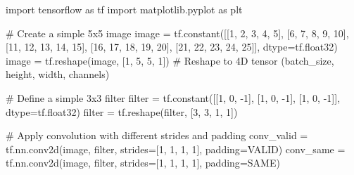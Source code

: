 \documentclass[
  letterpaper,
  DIV=11,
  numbers=noendperiod]{scrreprt}
\newenvironment{Shaded}{\begin{snugshade}}{\end{snugshade}}
\newcommand{\BuiltInTok}[1]{\textcolor[rgb]{0.00,0.23,0.31}{#1}}
\newcommand{\CommentTok}[1]{\textcolor[rgb]{0.37,0.37,0.37}{#1}}
\newcommand{\DecValTok}[1]{\textcolor[rgb]{0.68,0.00,0.00}{#1}}
\newcommand{\ImportTok}[1]{\textcolor[rgb]{0.00,0.46,0.62}{#1}}
\newcommand{\NormalTok}[1]{\textcolor[rgb]{0.00,0.23,0.31}{#1}}
\newcommand{\OperatorTok}[1]{\textcolor[rgb]{0.37,0.37,0.37}{#1}}
\newcommand{\StringTok}[1]{\textcolor[rgb]{0.13,0.47,0.30}{#1}}
\begin{document}
\begin{Shaded}
\begin{Highlighting}[]
\ImportTok{import}\NormalTok{ tensorflow }\ImportTok{as}\NormalTok{ tf}
\ImportTok{import}\NormalTok{ matplotlib.pyplot }\ImportTok{as}\NormalTok{ plt}

\CommentTok{\# Create a simple 5x5 image}
\NormalTok{image }\OperatorTok{=}\NormalTok{ tf.constant([[}\DecValTok{1}\NormalTok{, }\DecValTok{2}\NormalTok{, }\DecValTok{3}\NormalTok{, }\DecValTok{4}\NormalTok{, }\DecValTok{5}\NormalTok{],}
\NormalTok{                     [}\DecValTok{6}\NormalTok{, }\DecValTok{7}\NormalTok{, }\DecValTok{8}\NormalTok{, }\DecValTok{9}\NormalTok{, }\DecValTok{10}\NormalTok{],}
\NormalTok{                     [}\DecValTok{11}\NormalTok{, }\DecValTok{12}\NormalTok{, }\DecValTok{13}\NormalTok{, }\DecValTok{14}\NormalTok{, }\DecValTok{15}\NormalTok{],}
\NormalTok{                     [}\DecValTok{16}\NormalTok{, }\DecValTok{17}\NormalTok{, }\DecValTok{18}\NormalTok{, }\DecValTok{19}\NormalTok{, }\DecValTok{20}\NormalTok{],}
\NormalTok{                     [}\DecValTok{21}\NormalTok{, }\DecValTok{22}\NormalTok{, }\DecValTok{23}\NormalTok{, }\DecValTok{24}\NormalTok{, }\DecValTok{25}\NormalTok{]], dtype}\OperatorTok{=}\NormalTok{tf.float32)}
\NormalTok{image }\OperatorTok{=}\NormalTok{ tf.reshape(image, [}\DecValTok{1}\NormalTok{, }\DecValTok{5}\NormalTok{, }\DecValTok{5}\NormalTok{, }\DecValTok{1}\NormalTok{])  }\CommentTok{\# Reshape to 4D tensor (batch\_size, height, width, channels)}

\CommentTok{\# Define a simple 3x3 filter}
\BuiltInTok{filter} \OperatorTok{=}\NormalTok{ tf.constant([[}\DecValTok{1}\NormalTok{, }\DecValTok{0}\NormalTok{, }\OperatorTok{{-}}\DecValTok{1}\NormalTok{], [}\DecValTok{1}\NormalTok{, }\DecValTok{0}\NormalTok{, }\OperatorTok{{-}}\DecValTok{1}\NormalTok{], [}\DecValTok{1}\NormalTok{, }\DecValTok{0}\NormalTok{, }\OperatorTok{{-}}\DecValTok{1}\NormalTok{]], dtype}\OperatorTok{=}\NormalTok{tf.float32)}
\BuiltInTok{filter} \OperatorTok{=}\NormalTok{ tf.reshape(}\BuiltInTok{filter}\NormalTok{, [}\DecValTok{3}\NormalTok{, }\DecValTok{3}\NormalTok{, }\DecValTok{1}\NormalTok{, }\DecValTok{1}\NormalTok{])}

\CommentTok{\# Apply convolution with different strides and padding}
\NormalTok{conv\_valid }\OperatorTok{=}\NormalTok{ tf.nn.conv2d(image, }\BuiltInTok{filter}\NormalTok{, strides}\OperatorTok{=}\NormalTok{[}\DecValTok{1}\NormalTok{, }\DecValTok{1}\NormalTok{, }\DecValTok{1}\NormalTok{, }\DecValTok{1}\NormalTok{], padding}\OperatorTok{=}\StringTok{\textquotesingle{}VALID\textquotesingle{}}\NormalTok{)}
\NormalTok{conv\_same }\OperatorTok{=}\NormalTok{ tf.nn.conv2d(image, }\BuiltInTok{filter}\NormalTok{, strides}\OperatorTok{=}\NormalTok{[}\DecValTok{1}\NormalTok{, }\DecValTok{1}\NormalTok{, }\DecValTok{1}\NormalTok{, }\DecValTok{1}\NormalTok{], padding}\OperatorTok{=}\StringTok{\textquotesingle{}SAME\textquotesingle{}}\NormalTok{)}


\end{Highlighting}
\end{Shaded}
\end{document}

